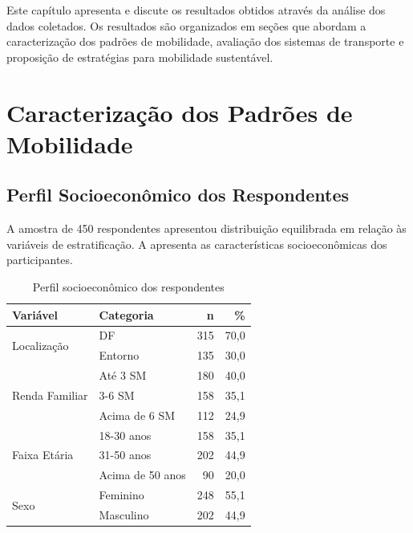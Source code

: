 

Este capítulo apresenta e discute os resultados obtidos através da análise dos dados coletados. Os resultados são organizados em seções que abordam a caracterização dos padrões de mobilidade, avaliação dos sistemas de transporte e proposição de estratégias para mobilidade sustentável.

\section{Caracterização dos Padrões de Mobilidade}

\subsection{Perfil Socioeconômico dos Respondentes}

A amostra de 450 respondentes apresentou distribuição equilibrada em relação às variáveis de estratificação. A  apresenta as características socioeconômicas dos participantes.

\begin{table}[htb]
    \centering
    \caption{Perfil socioeconômico dos respondentes}
    \label{tab:perfil-respondentes}
    \begin{tabular}{llrr}
        \toprule
        \textbf{Variável} & \textbf{Categoria} & \textbf{n} & \textbf{\%} \\
        \midrule
        \multirow{2}{*}{Localização} & DF & 315 & 70,0 \\
                                     & Entorno & 135 & 30,0 \\
        \midrule
        \multirow{3}{*}{Renda Familiar} & Até 3 SM & 180 & 40,0 \\
                                       & 3-6 SM & 158 & 35,1 \\
                                       & Acima de 6 SM & 112 & 24,9 \\
        \midrule
        \multirow{3}{*}{Faixa Etária} & 18-30 anos & 158 & 35,1 \\
                                      & 31-50 anos & 202 & 44,9 \\
                                      & Acima de 50 anos & 90 & 20,0 \\
        \midrule
        \multirow{2}{*}{Sexo} & Feminino & 248 & 55,1 \\
                              & Masculino & 202 & 44,9 \\
        \bottomrule
    \end{tabular}
\end{table}

